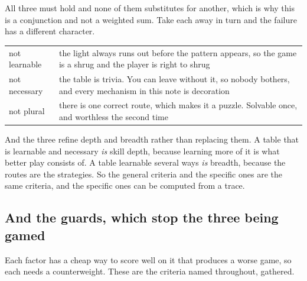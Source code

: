 \documentclass[11pt,a4paper]{article}
\begin{document}
All three must hold and none of them substitutes for another, which is why this is a conjunction
and not a weighted sum. Take each away in turn and the failure has a different character.

\begin{center}
\begin{tabular}{@{}l@{\hspace{5mm}}>{\raggedright\arraybackslash}p{}@{}}
\toprule
not learnable & the light always runs out before the pattern appears, so the game is a shrug and
the player is right to shrug \\[1mm]
not necessary & the table is trivia. You can leave without it, so nobody bothers, and every
mechanism in this note is decoration \\[1mm]
not plural    & there is one correct route, which makes it a puzzle. Solvable once, and worthless
the second time \\
\bottomrule
\end{tabular}
\end{center}

\begin{sectionbox}
And the three refine depth and breadth rather than replacing them. A table that is learnable and
necessary \emph{is} skill depth, because learning more of it is what better play consists of. A
table learnable several ways \emph{is} breadth, because the routes are the strategies. So the
general criteria and the specific ones are the same criteria, and the specific ones can be computed
from a trace.
\end{sectionbox}

\subsection{And the guards, which stop the three being gamed}

Each factor has a cheap way to score well on it that produces a worse game, so each needs a
counterweight. These are the criteria named throughout, gathered.
\end{document}

